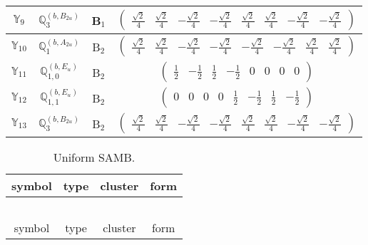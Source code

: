 \documentclass[fleqn,10pt,landscape]{article}
\begin{document}
\begin{itemize}
\begin{center}
\begin{longtable}{c|c|c|c}
$ \mathbb{Y}_{9} $ & $\mathbb{Q}_{3}^{(b,B_{2u})}$ & B$_{1}$ & $\begin{pmatrix} \frac{\sqrt{2}}{4} & \frac{\sqrt{2}}{4} & - \frac{\sqrt{2}}{4} & - \frac{\sqrt{2}}{4} & \frac{\sqrt{2}}{4} & \frac{\sqrt{2}}{4} & - \frac{\sqrt{2}}{4} & - \frac{\sqrt{2}}{4} \end{pmatrix}$ \\ \hline
$ \mathbb{Y}_{10} $ & $\mathbb{Q}_{1}^{(b,A_{2u})}$ & B$_{2}$ & $\begin{pmatrix} \frac{\sqrt{2}}{4} & \frac{\sqrt{2}}{4} & - \frac{\sqrt{2}}{4} & - \frac{\sqrt{2}}{4} & - \frac{\sqrt{2}}{4} & - \frac{\sqrt{2}}{4} & \frac{\sqrt{2}}{4} & \frac{\sqrt{2}}{4} \end{pmatrix}$ \\
$ \mathbb{Y}_{11} $ & $\mathbb{Q}_{1,0}^{(b,E_{u})}$ & B$_{2}$ & $\begin{pmatrix} \frac{1}{2} & - \frac{1}{2} & \frac{1}{2} & - \frac{1}{2} & 0 & 0 & 0 & 0 \end{pmatrix}$ \\
$ \mathbb{Y}_{12} $ & $\mathbb{Q}_{1,1}^{(b,E_{u})}$ & B$_{2}$ & $\begin{pmatrix} 0 & 0 & 0 & 0 & \frac{1}{2} & - \frac{1}{2} & \frac{1}{2} & - \frac{1}{2} \end{pmatrix}$ \\
$ \mathbb{Y}_{13} $ & $\mathbb{Q}_{3}^{(b,B_{2u})}$ & B$_{2}$ & $\begin{pmatrix} \frac{\sqrt{2}}{4} & \frac{\sqrt{2}}{4} & - \frac{\sqrt{2}}{4} & - \frac{\sqrt{2}}{4} & \frac{\sqrt{2}}{4} & \frac{\sqrt{2}}{4} & - \frac{\sqrt{2}}{4} & - \frac{\sqrt{2}}{4} \end{pmatrix}$ \\
\end{longtable}
\end{center}
\begin{center}
\renewcommand{\arraystretch}{1.3}
\begin{longtable}{c|c|c|c}
\caption{Uniform SAMB.}
 \\
 \hline \hline
symbol & type & cluster & form \\ \hline \endfirsthead

\multicolumn{3}{l}{\tablename\ \thetable{}} \\
 \hline \hline
symbol & type & cluster & form \\ \hline \endhead


\end{longtable}
\end{center}
\end{itemize}
\end{document}
